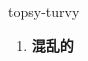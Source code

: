 
\begin{frame}
{\huge topsy-turvy}
\begin{center}
\begin{enumerate}\Large
  \item \textbf{混乱的}
\end{enumerate}
\end{center}
\end{frame}
